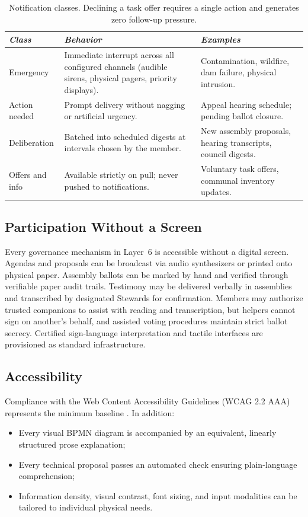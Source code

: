 \begin{table}[htbp]
\centering
\small
\begin{tabular}{|p{}|p{}|p{}|}
\hline
\textit{Class} & \textit{Behavior} & \textit{Examples} \\
\hline
Emergency & Immediate interrupt across all configured channels (audible sirens, physical pagers, priority displays). & Contamination, wildfire, dam failure, physical intrusion. \\
\hline
Action needed & Prompt delivery without nagging or artificial urgency. & Appeal hearing schedule; pending ballot closure. \\
\hline
Deliberation & Batched into scheduled digests at intervals chosen by the member. & New assembly proposals, hearing transcripts, council digests. \\
\hline
Offers and info & Available strictly on pull; never pushed to notifications. & Voluntary task offers, communal inventory updates. \\
\hline
\end{tabular}
\caption{Notification classes. Declining a task offer requires a single action and generates zero follow-up pressure.}
\label{tab:l6-notify}
\end{table}

\subsection{Participation Without a Screen}

Every governance mechanism in Layer~6 is accessible without a digital screen. Agendas and proposals can be broadcast via audio synthesizers or printed onto physical paper. Assembly ballots can be marked by hand and verified through verifiable paper audit trails. Testimony may be delivered verbally in assemblies and transcribed by designated Stewards for confirmation. Members may authorize trusted companions to assist with reading and transcription, but helpers cannot sign on another's behalf, and assisted voting procedures maintain strict ballot secrecy. Certified sign-language interpretation and tactile interfaces are provisioned as standard infrastructure.

\subsection{Accessibility}

Compliance with the Web Content Accessibility Guidelines (WCAG 2.2 AAA) represents the minimum baseline \parencite{w3c2023wcag}. In addition:
\begin{itemize}
  \item Every visual BPMN diagram is accompanied by an equivalent, linearly structured prose explanation;
  \item Every technical proposal passes an automated check ensuring plain-language comprehension;
  \item Information density, visual contrast, font sizing, and input modalities can be tailored to individual physical needs.
\end{itemize}

